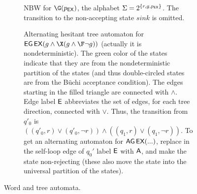 \begin{example}
\begin{figure}[tb]
\begin{subfigure}[t]{\linewidth}
\caption{%
  NBW for $\G(p_{\EX})$,
  the alphabet $\Sigma=2^{\{r, g, p_{\operatorname{\mathsf{EX}}}\}}$.
  The transition to the non-accepting state $sink$ is omitted.}
\label{fig:nbw-g}
\end{subfigure}
\begin{subfigure}[t]{\linewidth}\center

\caption{Alternating hesitant tree automaton for $\EG\EX(g \land \X(g \land \F\neg g))$ (actually it is nondeterministic).
  The green color of the states indicate that they are from
  the nondeterministic partition of the states
  (and thus double-circled states are from the B\"uchi acceptance condition).
  The edges starting in the filled triangle are connected with $\land$.
  Edge label ${\operatorname{\mathsf{E}}}$ abbreviates the set of edges, for each tree direction, connected with $\lor$.
  Thus, the transition from $q'_0$ is $((q'_0, r) \lor (q'_0,\neg r)) \land ((q_1, r) \lor (q_1,\neg r))$.
  To get an alternating automaton for $\operatorname{\mathsf{AG}}\operatorname{\mathsf{EX}}(...)$,
  replace in the self-loop edge of $q_0'$ label ${\operatorname{\mathsf{E}}}$ with ${\operatorname{\mathsf{A}}}$,
  and make the state non-rejecting
  (these also move the state into the universal partition of the states).}
\end{subfigure}
\caption{Word and tree automata.}
\label{fig:automata}
\end{figure}
\end{example}

\smallskip

